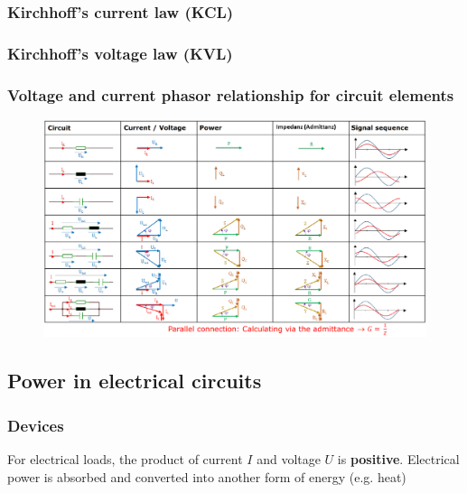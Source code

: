 \documentclass{article}
\begin{document}
\subsubsection{Kirchhoff's current law (KCL)}

\subsubsection{Kirchhoff's voltage law (KVL)}

\subsubsection{Voltage and current phasor relationship for circuit elements}

\clearpage
\begin{landscape}

  \begin{figure}[p]
    \centering
    \includegraphics[width=1.5\textheight]{media/shifts_summary.png}
  \end{figure}

\end{landscape}
\clearpage  

\newpage
\subsection{Power in electrical circuits}
\subsubsection{Devices}
For electrical loads, the product of current $I$ and voltage $U$ is
\textbf{positive}. Electrical power is absorbed and converted into
another form of energy (e.g. heat)
\end{document}
